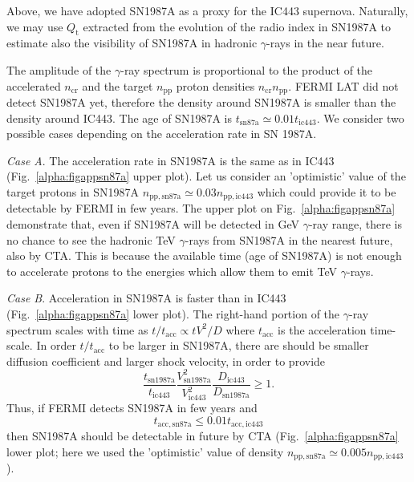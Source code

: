 \documentclass{aa}
\newcommand\rs[1]{_\mathrm{#1}}
\newcommand\g{$\gamma$}
\begin{document}
Above, we have adopted SN1987A as a proxy for the IC443 supernova. Naturally, we may use $Q\rs{t}$ extracted from the evolution of the radio index in SN1987A to estimate also the visibility of SN1987A in hadronic \g-rays in the near future. 

The amplitude of the \g-ray spectrum is proportional to the product of the accelerated $n\rs{cr}$ and the target $n\rs{pp}$ proton densities $n\rs{cr}n\rs{pp}$. FERMI LAT did not detect SN1987A yet, therefore the density around SN1987A is smaller than the density around IC443. The age of SN1987A is $t\rs{sn87a}\simeq 0.01 t\rs{ic443}$. We consider two possible cases depending on the acceleration rate in SN 1987A.

\textit{Case A}. The acceleration rate in SN1987A is the same as in IC443 (Fig.~\ref{alpha:figappsn87a} upper plot). Let us consider an 'optimistic' value of the target protons in SN1987A $n\rs{pp,sn87a}\simeq 0.03 n\rs{pp,ic443}$ which could provide it to be detectable by FERMI in few years. The upper plot on Fig.~\ref{alpha:figappsn87a} demonstrate that, even if SN1987A will be detected in GeV \g-ray range, there is no chance to see the hadronic TeV \g-rays from SN1987A in the nearest future, also by CTA. This is because the available time (age of SN1987A) is not enough to accelerate protons to the energies which allow them to emit TeV \g-rays.  

\textit{Case B}. Acceleration in SN1987A is faster than in IC443 (Fig.~\ref{alpha:figappsn87a} lower plot). The right-hand portion of the \g-ray spectrum scales with time as $t/t\rs{acc}\propto tV^2/D$ where $t\rs{acc}$ is the acceleration time-scale. In order $t/t\rs{acc}$ to be larger in SN1987A, there are should be smaller diffusion coefficient and larger shock velocity, in order to provide 
\begin{equation}
\frac{t\rs{sn1987a}}{t\rs{ic443}}\frac{V\rs{sn1987a}^2}{V\rs{ic443}^2}\frac{D\rs{ic443}}{D\rs{sn1987a}}\geq 1.
\end{equation}
Thus, if FERMI detects SN1987A in few years and 
\begin{equation}
t\rs{acc,sn87a}\leq 0.01 t\rs{acc,ic443} 
\end{equation}
then SN1987A should be detectable in future by CTA (Fig.~\ref{alpha:figappsn87a} lower plot; here we used the 'optimistic' value of density $n\rs{pp,sn87a}\simeq 0.005 n\rs{pp,ic443}$).
\end{document}
